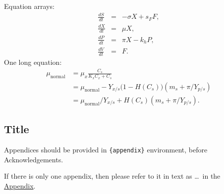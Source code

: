 \documentclass[aihp]{imsart}
\theoremstyle{plain}
\theoremstyle{definition}
\begin{document}
Equation arrays:
\begin{eqnarray}
  \frac{dS}{dt} & = & - \sigma X + s_{F} F,\\
  \frac{dX}{dt} & = &   \mu    X,\\
  \frac{dP}{dt} & = &   \pi    X - k_{h} P,\\
  \frac{dV}{dt} & = &   F.
\end{eqnarray}
One long equation:
\begin{equation}
\begin{aligned}
 \mu_{\text{normal}} & =  \mu_{x} \frac{C_{s}}{K_{x}C_{x}+C_{s}} \\
                     & =  \mu_{\text{normal}} - Y_{x/s}\bigl(1-H(C_{s})\bigr)(m_{s}+\pi /Y_{p/s})\\
                     & =  \mu_{\text{normal}}/Y_{x/s}+ H(C_{s}) (m_{s}+ \pi /Y_{p/s}).
\end{aligned}
\end{equation}
\begin{appendix}
\section*{Title}\label{appn} %
Appendices should be provided in \verb|{appendix}| environment,
before Acknowledgements.

If there is only one appendix,
then please refer to it in text as \ldots\ in the \hyperref[appn]{Appendix}.
\end{appendix}
\end{document}
